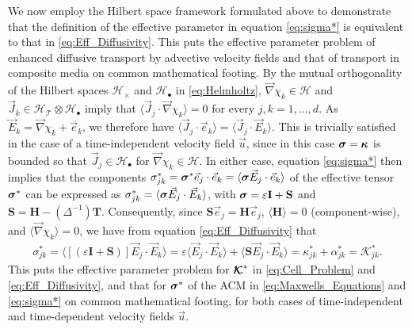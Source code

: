 \documentclass[11pt]{amsart}
\newcommand{\Tb}{\mathbf{T}}
\newcommand{\Hb}{\mathbf{H}}
\newcommand{\Ib}{\mathbf{I}}
\newcommand{\Sb}{\mathbf{S}}
\newcommand{\Kc}{\mathcal{K}}
\newcommand\Kbc{\mbox{\boldmath${\mathcal{K}}$}}
\newcommand{\Tc}{\mathcal{T}}
\newcommand{\Hs}{\mathscr{H}}
\newcommand\bsig{\mbox{\boldmath${\sigma}$}}
\newcommand\bkappa{\mbox{\boldmath${\kappa}$}}
\begin{document}
We now employ the Hilbert space framework formulated above to
demonstrate that the definition of the effective parameter in equation 
\eqref{eq:sigma*} is equivalent to that in
\eqref{eq:Eff_Diffusivity}. This puts the effective parameter
problem of enhanced diffusive transport by advective velocity fields
and that of transport in composite media on common mathematical
footing. By the mutual orthogonality of the Hilbert spaces $\Hs_\times$ and
$\Hs_\bullet$ in \eqref{eq:Helmholtz}, $\vec{\nabla}\chi_k\in\Hs$ and
$\vec{J}_k\in\Hs_{\Tc}\otimes\Hs_\bullet$ imply that $\langle\vec{J}_j\cdot\vec{\nabla}\chi_k\rangle=0$ 
for every $j,k=1,\ldots,d$. As $\vec{E}_k=\vec{\nabla}\chi_k+\vec{e}_k$, we therefore
have $\langle\vec{J}_j\cdot\vec{e}_k\rangle=\langle\vec{J}_j\cdot\vec{E}_k\rangle$. This is trivially
satisfied in the case of a time-independent velocity field $\vec{u}$, 
since in this case $\bsig=\bkappa$ is bounded so that
$\vec{J}_j\in\Hs_\bullet$ for $\vec{\nabla}\chi_k\in\Hs$. In either case, equation
\eqref{eq:sigma*} then implies that the components
$\sigma^*_{jk}=\bsig^*\vec{e}_j\cdot\vec{e}_k=\langle\bsig\vec{E}_j\cdot\vec{e}_k\rangle$ of
the effective tensor $\bsig^*$ can be expressed as
$\sigma^*_{jk}=\langle\bsig\vec{E}_j\cdot\vec{E}_k\rangle$, with $\bsig=\varepsilon\Ib+\Sb$ and
$\Sb=\Hb-(\Delta^{-1})\Tb$. Consequently, since
$\Sb\vec{e}_j=\Hb\vec{e}_j$, $\langle\Hb\rangle=0$ (component-wise), and
$\langle\vec{\nabla}\chi_k\rangle=0$, we have from equation \eqref{eq:Eff_Diffusivity}
that  
%
\begin{align}\label{eq:Reduction}
  \sigma^*_{jk}%
       =\langle[(\varepsilon\Ib+\Sb)]\vec{E}_j\cdot\vec{E}_k\rangle
       =\varepsilon\langle\vec{E}_j\cdot\vec{E}_k\rangle+\langle\Sb\vec{E}_j\cdot\vec{E}_k\rangle
       =\kappa^*_{jk}+\alpha^*_{jk}
       =\Kc_{jk}^*.
\end{align}
%
This puts the effective parameter problem for $\Kbc^*$ in
\eqref{eq:Cell_Problem} and \eqref{eq:Eff_Diffusivity}, and that for
$\bsig^*$ of the ACM \cite{Golden:CMP-473} in
\eqref{eq:Maxwells_Equations} and \eqref{eq:sigma*} on common
mathematical footing, for both cases of time-independent and
time-dependent velocity fields $\vec{u}$.  
\end{document}
